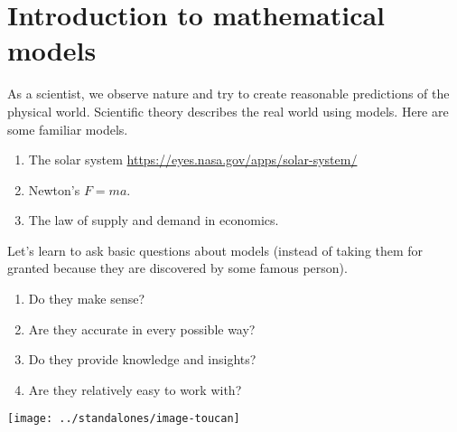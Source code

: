 \documentclass[../main.tex]{subfiles}
\begin{document}
 \section{Introduction to mathematical models}

As a scientist, we observe nature and try to create reasonable predictions of the physical world. Scientific theory describes the real world using models. Here are some familiar models.

\begin{enumerate}
  \item The solar system \url{https://eyes.nasa.gov/apps/solar-system/}
  \item Newton's \(F = ma\).
  \item The law of supply and demand in economics.
\end{enumerate}

Let's learn to ask basic questions about models (instead of taking them for granted because they are discovered by some famous person).
\begin{enumerate}[wide]
  \item Do they make sense? 


  \item Are they accurate in every possible way? 


  \item Do they provide knowledge and insights? 


  \item Are they relatively easy to work with? 

\end{enumerate}

\clearpage
\vspace{-1in}
\centerline{\texttt{[image: ../standalones/image-toucan]}}
\end{document}
